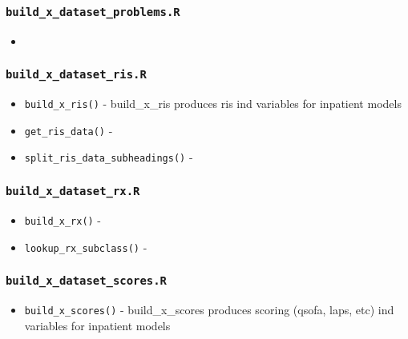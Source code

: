 \documentclass[
]{book}
\providecommand{\tightlist}{%
  \setlength{\itemsep}{0pt}\setlength{\parskip}{0pt}}
\begin{document}
\hypertarget{build_x_dataset_problems.r}{%
\subsubsection{\texorpdfstring{\texttt{build\_x\_dataset\_problems.R}}{build\_x\_dataset\_problems.R}}\label{build_x_dataset_problems.r}}

\begin{itemize}
\item
\end{itemize}

\hypertarget{build_x_dataset_ris.r}{%
\subsubsection{\texorpdfstring{\texttt{build\_x\_dataset\_ris.R}}{build\_x\_dataset\_ris.R}}\label{build_x_dataset_ris.r}}

\begin{itemize}
\tightlist
\item
  \texttt{build\_x\_ris()} - build\_x\_ris produces ris ind variables for inpatient models
\item
  \texttt{get\_ris\_data()} -
\item
  \texttt{split\_ris\_data\_subheadings()} -
\end{itemize}

\hypertarget{build_x_dataset_rx.r}{%
\subsubsection{\texorpdfstring{\texttt{build\_x\_dataset\_rx.R}}{build\_x\_dataset\_rx.R}}\label{build_x_dataset_rx.r}}

\begin{itemize}
\tightlist
\item
  \texttt{build\_x\_rx()} -
\item
  \texttt{lookup\_rx\_subclass()} -
\end{itemize}

\hypertarget{build_x_dataset_scores.r}{%
\subsubsection{\texorpdfstring{\texttt{build\_x\_dataset\_scores.R}}{build\_x\_dataset\_scores.R}}\label{build_x_dataset_scores.r}}

\begin{itemize}
\tightlist
\item
  \texttt{build\_x\_scores()} - build\_x\_scores produces scoring (qsofa, laps, etc) ind variables for inpatient models
\end{itemize}
\end{document}
